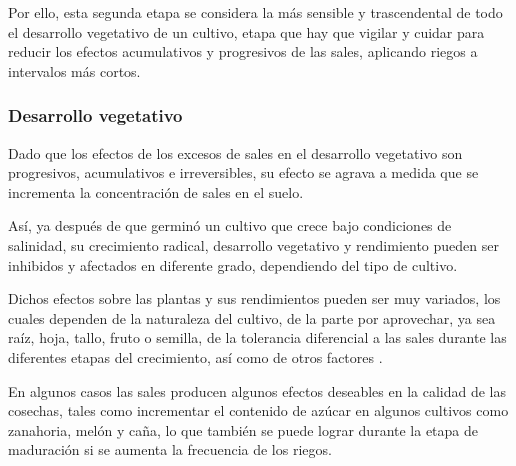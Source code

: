 Por ello, esta segunda etapa se considera la más sensible y trascendental de todo el desarrollo vegetativo de un cultivo, etapa que hay que vigilar y cuidar para reducir los efectos acumulativos y progresivos de las sales, aplicando riegos a intervalos más cortos.

\subsubsection{Desarrollo vegetativo}
Dado que los efectos de los excesos de sales en el desarrollo vegetativo son progresivos, acumulativos e irreversibles, su efecto se agrava a medida que se incrementa la concentración de sales en el suelo.

Así, ya después de que germinó un cultivo que crece bajo condiciones de salinidad, su crecimiento radical, desarrollo vegetativo y rendimiento pueden ser inhibidos y afectados en diferente grado, dependiendo del tipo de cultivo.

Dichos efectos sobre las plantas y sus rendimientos pueden ser muy variados, los cuales dependen de la naturaleza del cultivo, de la parte por aprovechar, ya sea raíz, hoja, tallo, fruto o semilla, de la tolerancia diferencial a las sales durante las diferentes etapas del crecimiento, así como de otros factores .

En algunos casos las sales producen algunos efectos deseables en la calidad de las cosechas, tales como incrementar el contenido de azúcar en algunos cultivos como zanahoria, melón y caña, lo que también se puede lograr durante la etapa de maduración si se aumenta la frecuencia de los riegos.

